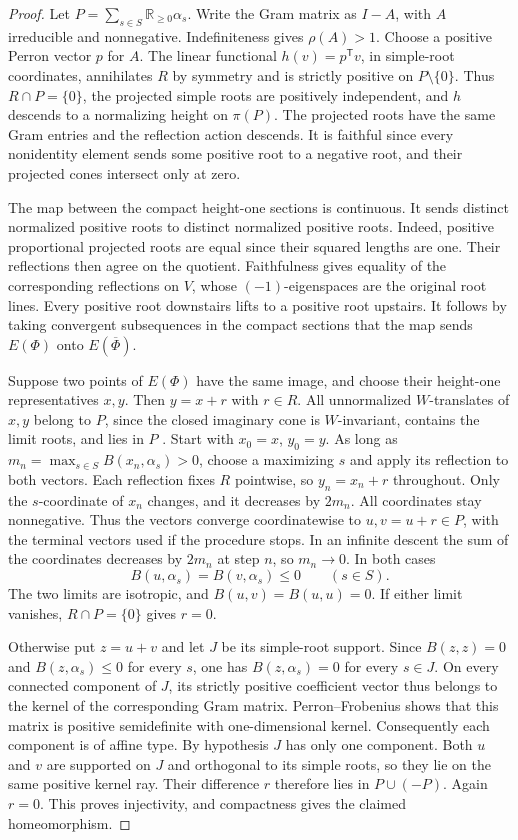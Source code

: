 \documentclass[11pt,reqno]{amsart}
\theoremstyle{plain}
\theoremstyle{definition}
\theoremstyle{remark}
\numberwithin{equation}{section}
\begin{document}
\begin{proof}
Let $P=\sum_{s\in S}\mathbb R_{\geq 0}\alpha_s$.
Write the Gram matrix as $I-A$, with $A$ irreducible and nonnegative.
Indefiniteness gives $\rho(A)>1$. Choose a positive Perron vector $p$
for $A$. The linear functional $h(v)=p^{\mathsf T}v$, in simple-root
coordinates, annihilates $R$ by symmetry and is strictly positive on
$P\setminus\{0\}$. Thus $R\cap P=\{0\}$, the projected simple roots
are positively independent, and $h$ descends to a normalizing height on
$\pi(P)$. The projected roots have the same Gram entries and the
reflection action descends. It is faithful since every nonidentity
element sends some positive root to a negative root, and their projected
cones intersect only at zero.

The map between the compact height-one sections is continuous. It
sends distinct normalized positive roots to distinct normalized positive
roots. Indeed, positive proportional projected roots are equal since
their squared lengths are one. Their reflections then agree on the
quotient. Faithfulness gives equality of the corresponding reflections
on $V$, whose $(-1)$-eigenspaces are the original root lines.
Every positive root downstairs lifts to a positive root upstairs.
It follows by taking convergent subsequences in the compact sections
that the map sends $E(\Phi)$ onto $E(\overline\Phi)$.

Suppose two points of $E(\Phi)$ have the same image, and choose their
height-one representatives $x,y$. Then $y=x+r$ with $r\in R$.
All unnormalized $W$-translates of $x,y$ belong to $P$, since the
closed imaginary cone is $W$-invariant, contains the limit roots,
and lies in $P$ \cite[Theorem~2.2]{DHR}. Start with $x_0=x$, $y_0=y$.
As long as $m_n=\max_{s\in S}B(x_n,\alpha_s)>0$, choose a maximizing
$s$ and apply its reflection to both vectors. Each reflection fixes $R$
pointwise, so $y_n=x_n+r$ throughout. Only the $s$-coordinate of $x_n$
changes, and it decreases by $2m_n$. All coordinates stay nonnegative.
Thus the vectors converge coordinatewise to $u,v=u+r\in P$, with the
terminal vectors used if the procedure stops. In an infinite descent
the sum of the coordinates decreases by $2m_n$ at step $n$, so $m_n\to0$.
In both cases
\[
   B(u,\alpha_s)=B(v,\alpha_s)\leq0\qquad(s\in S).
\]
The two limits are isotropic, and $B(u,v)=B(u,u)=0$.
If either limit vanishes, $R\cap P=\{0\}$ gives $r=0$.

Otherwise put $z=u+v$ and let $J$ be its simple-root support. Since
$B(z,z)=0$ and $B(z,\alpha_s)\leq0$ for every $s$, one has
$B(z,\alpha_s)=0$ for every $s\in J$. On every connected component
of $J$, its strictly positive coefficient vector thus belongs to the
kernel of the corresponding Gram matrix. Perron--Frobenius shows that
this matrix is positive semidefinite with one-dimensional kernel.
Consequently each component is of affine type. By hypothesis $J$
has only one component. Both $u$ and $v$ are supported on $J$ and
orthogonal to its simple roots, so they lie on the same positive
kernel ray. Their difference $r$ therefore lies in $P\cup(-P)$.
Again $r=0$. This proves injectivity, and compactness gives the
claimed homeomorphism.
\end{proof}
\end{document}
